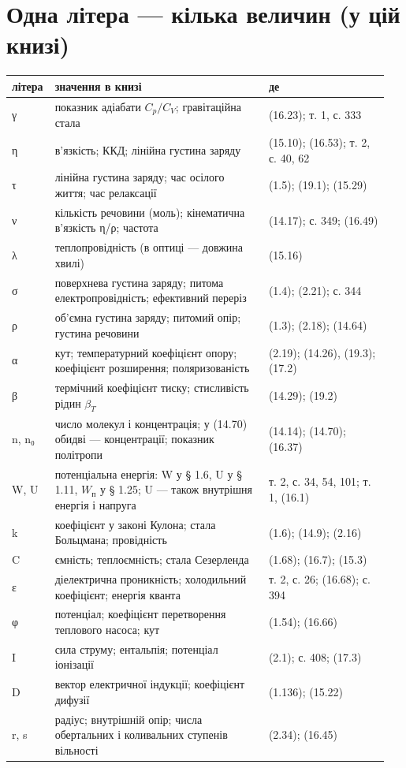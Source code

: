 \documentclass[11pt,a4paper,oneside]{book}
\begin{document}
\section*{Одна літера — кілька величин (у цій книзі)}

{\small
\begin{longtable}{>{\raggedright\arraybackslash}p{0.078\linewidth}>{\raggedright\arraybackslash}p{0.559\linewidth}>{\raggedright\arraybackslash}p{0.315\linewidth}}
\toprule
\textbf{літера} & \textbf{значення в книзі} & \textbf{де} \\
\midrule
\endhead
γ & показник адіабати $C_p/C_V$; гравітаційна стала & (16.23); т. 1, с. 333 \\
η & в'язкість; ККД; лінійна густина заряду & (15.10); (16.53); т. 2, с. 40, 62 \\
τ & лінійна густина заряду; час осілого життя; час релаксації & (1.5); (19.1); (15.29) \\
ν & кількість речовини (моль); кінематична в'язкість η/ρ; частота & (14.17); с. 349; (16.49) \\
λ & теплопровідність (в оптиці — довжина хвилі) & (15.16) \\
σ & поверхнева густина заряду; питома електропровідність; ефективний переріз & (1.4); (2.21); с. 344 \\
ρ & об'ємна густина заряду; питомий опір; густина речовини & (1.3); (2.18); (14.64) \\
α & кут; температурний коефіцієнт опору; коефіцієнт розширення; поляризованість & (2.19); (14.26), (19.3); (17.2) \\
β & термічний коефіцієнт тиску; стисливість рідин $\beta_T$ & (14.29); (19.2) \\
n, n₀ & число молекул і концентрація; у (14.70) обидві — концентрації; показник політропи & (14.14); (14.70); (16.37) \\
W, U & потенціальна енергія: W у § 1.6, U у § 1.11, $W_\text{п}$ у § 1.25; U — також внутрішня енергія і напруга & т. 2, с. 34, 54, 101; т. 1, (16.1) \\
k & коефіцієнт у законі Кулона; стала Больцмана; провідність & (1.6); (14.9); (2.16) \\
C & ємність; теплоємність; стала Сезерленда & (1.68); (16.7); (15.3) \\
ε & діелектрична проникність; холодильний коефіцієнт; енергія кванта & т. 2, с. 26; (16.68); с. 394 \\
φ & потенціал; коефіцієнт перетворення теплового насоса; кут & (1.54); (16.66) \\
I & сила струму; ентальпія; потенціал іонізації & (2.1); с. 408; (17.3) \\
D & вектор електричної індукції; коефіцієнт дифузії & (1.136); (15.22) \\
r, s & радіус; внутрішній опір; числа обертальних і коливальних ступенів вільності & (2.34); (16.45) \\
\bottomrule
\end{longtable}
}
\end{document}
